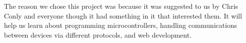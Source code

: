 The reason we chose this project was because it was suggested to us by Chris Conly and everyone though it had something in it that interested them. It will help us learn about programming microcontrollers, handling communications between devices via different protocols, and web development.  


